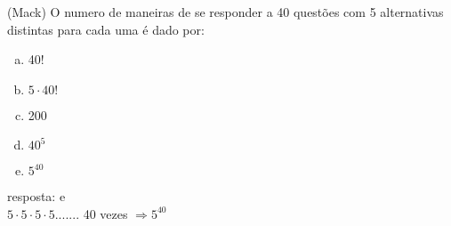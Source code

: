 \begin{ex}
 (Mack) O numero de maneiras de se responder a 40 questões com 5 alternativas distintas para cada uma é dado por:
    \begin{enumerate}[(a)]
    \item 40!
    \item $5\cdot40!$
    \item 200
    \item $40^5$
    \item $5^{40}$
    \end{enumerate}
      \begin{sol}
      resposta: e  \\
      $5\cdot5\cdot5\cdot5.......$ 40 vezes\hspace{0,3cm} $\Longrightarrow  5^{40}$
      \end{sol}
\end{ex}